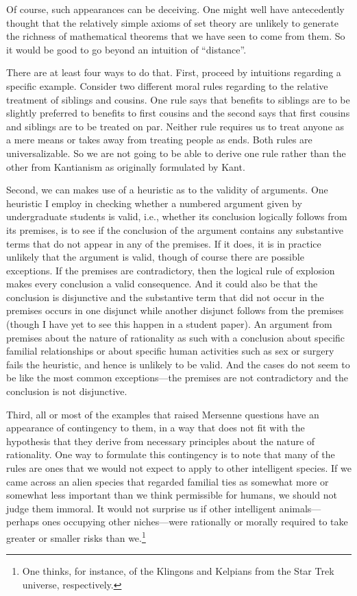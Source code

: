 Of course, such appearances can be deceiving. One might well have antecedently thought that the relatively simple axioms of set 
theory are unlikely to generate the richness of mathematical theorems that we have seen to come from them. So it would be good
to go beyond an intuition of ``distance''.

There are at least four ways to do that. First, proceed by intuitions regarding a specific example. Consider two different moral rules regarding to the relative treatment
of siblings and cousins. One rule says that benefits to siblings are to be slightly preferred to benefits to first cousins and the
second says that first cousins and siblings are to be treated on par. Neither rule requires us to treat anyone as a mere means or 
takes away from treating people as ends. Both rules are universalizable. So we are not going to be able to derive one rule rather
than the other from Kantianism as originally formulated by Kant. 

Second, we can makes use of a heuristic as to the validity of arguments. One heuristic I employ in checking whether a numbered argument 
given by undergraduate students is valid, i.e., whether its conclusion logically follows from its premises, is to see if the conclusion of the
argument contains any substantive terms that do not appear in any of the premises. If it does, it is in practice unlikely that the 
argument is valid, though of course there are possible exceptions. If the premises are contradictory, then the logical
rule of explosion makes every conclusion a valid consequence. And it could also be that the conclusion is disjunctive and the
substantive term that did not occur in the premises occurs in one disjunct while another disjunct follows from the premises (though 
I have yet to see this happen in a student paper).  An argument from premises about the nature of rationality as such
with a conclusion about specific familial relationships or about specific human activities such as sex or surgery fails the heuristic,
and hence is unlikely to be valid. And the cases do not seem to be like the most common exceptions---the premises are not contradictory
and the conclusion is not disjunctive.

Third, all or most of the examples that raised Mersenne questions have an appearance of contingency to them, in a way that does not
fit with the hypothesis that they derive from necessary principles about the nature of rationality. One way to formulate this
contingency is to note that many of the rules are ones that we would not expect to apply to other intelligent species. If we
came across an alien species that regarded familial ties as somewhat more or somewhat less important than we think permissible
for humans, we should not judge them immoral. It would not surprise us if other intelligent animals---perhaps ones occupying
other niches---were rationally or morally required to take greater or smaller risks than we.\footnote{One thinks, for instance,
of the Klingons and Kelpians from the Star Trek universe, respectively.}

